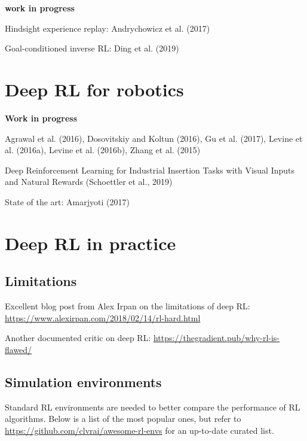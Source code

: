 \documentclass[
  letterpaper,
  DIV=11,
  numbers=noendperiod]{scrreprt}
\begin{document}
\textbf{work in progress}

Hindsight experience replay: Andrychowicz et al. (2017)

Goal-conditioned inverse RL: Ding et al. (2019)


\hypertarget{deep-rl-for-robotics}{%
\chapter{Deep RL for robotics}\label{deep-rl-for-robotics}}

\textbf{Work in progress}

Agrawal et al. (2016), Dosovitskiy and Koltun (2016), Gu et al. (2017),
Levine et al. (2016a), Levine et al. (2016b), Zhang et al. (2015)

Deep Reinforcement Learning for Industrial Insertion Tasks with Visual
Inputs and Natural Rewards (Schoettler et al., 2019)

State of the art: Amarjyoti (2017)


\hypertarget{deep-rl-in-practice}{%
\chapter{Deep RL in practice}\label{deep-rl-in-practice}}

\hypertarget{limitations}{%
\section{Limitations}\label{limitations}}

Excellent blog post from Alex Irpan on the limitations of deep RL:
\url{https://www.alexirpan.com/2018/02/14/rl-hard.html}

Another documented critic on deep RL:
\url{https://thegradient.pub/why-rl-is-flawed/}

\hypertarget{simulation-environments}{%
\section{Simulation environments}\label{simulation-environments}}

Standard RL environments are needed to better compare the performance of
RL algorithms. Below is a list of the most popular ones, but refer to
\url{https://github.com/clvrai/awesome-rl-envs} for an up-to-date
curated list.
\end{document}
